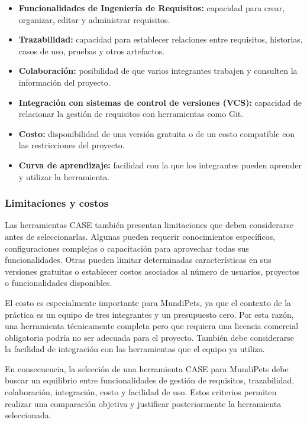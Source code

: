 \documentclass[journal,onecolumn]{IEEEtran}
\begin{document}
	\begin{itemize}[leftmargin=1.4em, itemsep=2pt, topsep=3pt]
		\item \textbf{Funcionalidades de Ingeniería de Requisitos:} capacidad para crear, organizar,
		editar y administrar requisitos.
		\item \textbf{Trazabilidad:} capacidad para establecer relaciones entre requisitos, historias,
		casos de uso, pruebas y otros artefactos.
		\item \textbf{Colaboración:} posibilidad de que varios integrantes trabajen y consulten la
		información del proyecto.
		\item \textbf{Integración con sistemas de control de versiones (VCS):} capacidad de relacionar
		la gestión de requisitos con herramientas como Git.
		\item \textbf{Costo:} disponibilidad de una versión gratuita o de un costo compatible con las
		restricciones del proyecto.
		\item \textbf{Curva de aprendizaje:} facilidad con la que los integrantes pueden aprender y
		utilizar la herramienta.
	\end{itemize}
	
	\subsubsection{Limitaciones y costos}
	
	Las herramientas CASE también presentan limitaciones que deben considerarse antes de
	seleccionarlas. Algunas pueden requerir conocimientos específicos, configuraciones complejas o
	capacitación para aprovechar todas sus funcionalidades. Otras pueden limitar determinadas
	características en sus versiones gratuitas o establecer costos asociados al número de usuarios,
	proyectos o funcionalidades disponibles.
	
	El costo es especialmente importante para MundiPets, ya que el contexto de la práctica es un equipo
	de tres integrantes y un presupuesto cero. Por esta razón, una herramienta técnicamente completa
	pero que requiera una licencia comercial obligatoria podría no ser adecuada para el proyecto.
	También debe considerarse la facilidad de integración con las herramientas que el equipo ya
	utiliza.
	
	En consecuencia, la selección de una herramienta CASE para MundiPets debe buscar un equilibrio
	entre funcionalidades de gestión de requisitos, trazabilidad, colaboración, integración, costo y
	facilidad de uso. Estos criterios permiten realizar una comparación objetiva y justificar
	posteriormente la herramienta seleccionada.
	
\end{document}
